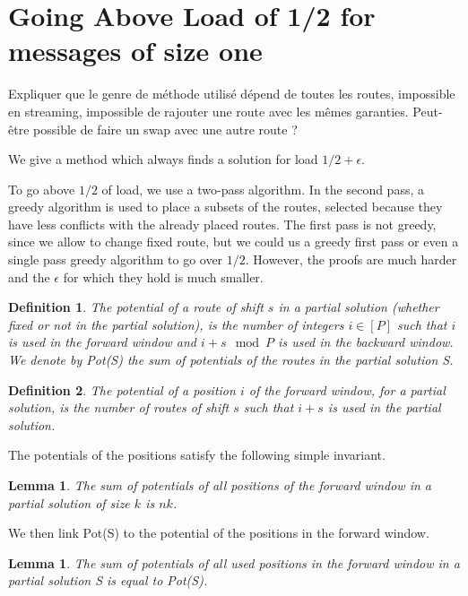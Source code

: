 \documentclass[10pt, conference, letterpaper]{IEEEtran}
\newtheorem{lemma}[theorem]{Lemma}
\newtheorem{definition}{Definition}
\begin{document}
\section{Going Above Load of 1/2 for messages of size one}


Expliquer que le genre de méthode utilisé dépend de toutes les routes,
impossible en streaming, impossible de rajouter une route avec les mêmes garanties.
Peut-être possible de faire un swap avec une autre route ?


We  give a method which always finds a solution for load $1/2 + \epsilon$.


To go above $1/2$ of load, we use a two-pass algorithm. In the second pass, a greedy algorithm is used 
to place a subsets of the routes, selected because they have less conflicts with the already placed 
routes. The first pass is not greedy, since we allow to change fixed route, but we could us a greedy first
pass or even a single pass greedy algorithm to go over $1/2$. However, the proofs are much harder and 
the $\epsilon$ for which they hold is much smaller.

\begin{definition}
The potential of a route of shift $s$ in a partial solution (whether fixed or not in the partial solution),
is the number of integers $i \in [P]$ such that $i$ is used in the forward window and $i+s \mod P$ is used in the backward window. We denote by Pot(S) the sum of potentials of the routes in the partial solution S.
\end{definition} 


\begin{definition}
The potential of a position $i$ of the forward window, for a partial solution, is the number of routes of shift $s$ such that $i+s$ is used in the partial solution. 
\end{definition}

The potentials of the positions satisfy the following simple invariant.
\begin{lemma}\label{lemma:inv}
The sum of potentials of all positions of the forward window in a partial solution of size $k$ is $nk$.  
\end{lemma}

We then link Pot(S) to the potential of the positions in the forward window.
\begin{lemma}\label{lemma:pot_pos}
The sum of potentials of all used positions in the forward window in a partial solution S is equal to Pot(S).  
\end{lemma}
 
\end{document}
